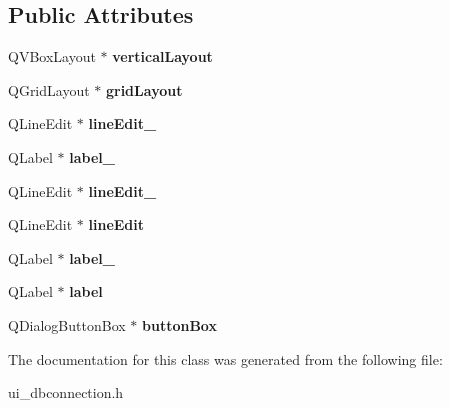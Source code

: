 \subsection*{Public Attributes}
\begin{DoxyCompactItemize}
\item 
\hypertarget{classUi__DBConnection_a58e4b7c10d7cc21090f4b1ce371ea1ff}{Q\-V\-Box\-Layout $\ast$ {\bfseries vertical\-Layout}}\label{classUi__DBConnection_a58e4b7c10d7cc21090f4b1ce371ea1ff}

\item 
\hypertarget{classUi__DBConnection_a3ec5814b07530b9e92fad39e0739b372}{Q\-Grid\-Layout $\ast$ {\bfseries grid\-Layout}}\label{classUi__DBConnection_a3ec5814b07530b9e92fad39e0739b372}

\item 
\hypertarget{classUi__DBConnection_ac250e54405208b9f68ac5de20d4a9b19}{Q\-Line\-Edit $\ast$ {\bfseries line\-Edit\-\_}}\label{classUi__DBConnection_ac250e54405208b9f68ac5de20d4a9b19}

\item 
\hypertarget{classUi__DBConnection_a33b57e55566cc6f84252ba72113f17c9}{Q\-Label $\ast$ {\bfseries label\-\_}}\label{classUi__DBConnection_a33b57e55566cc6f84252ba72113f17c9}

\item 
\hypertarget{classUi__DBConnection_a20d1bc3fbdad47f0288df9faf9137490}{Q\-Line\-Edit $\ast$ {\bfseries line\-Edit\-\_}}\label{classUi__DBConnection_a20d1bc3fbdad47f0288df9faf9137490}

\item 
\hypertarget{classUi__DBConnection_ace4c31d3e66f7adc3755b173febdadeb}{Q\-Line\-Edit $\ast$ {\bfseries line\-Edit}}\label{classUi__DBConnection_ace4c31d3e66f7adc3755b173febdadeb}

\item 
\hypertarget{classUi__DBConnection_a927fa90924399ea08ef88163ba5fe673}{Q\-Label $\ast$ {\bfseries label\-\_}}\label{classUi__DBConnection_a927fa90924399ea08ef88163ba5fe673}

\item 
\hypertarget{classUi__DBConnection_a45b71a2e523d34ad4862aafc96df3683}{Q\-Label $\ast$ {\bfseries label}}\label{classUi__DBConnection_a45b71a2e523d34ad4862aafc96df3683}

\item 
\hypertarget{classUi__DBConnection_a9a6172ea8a7b40554f069b968997b858}{Q\-Dialog\-Button\-Box $\ast$ {\bfseries button\-Box}}\label{classUi__DBConnection_a9a6172ea8a7b40554f069b968997b858}

\end{DoxyCompactItemize}


The documentation for this class was generated from the following file\-:\begin{DoxyCompactItemize}
\item 
ui\-\_\-dbconnection.\-h\end{DoxyCompactItemize}
